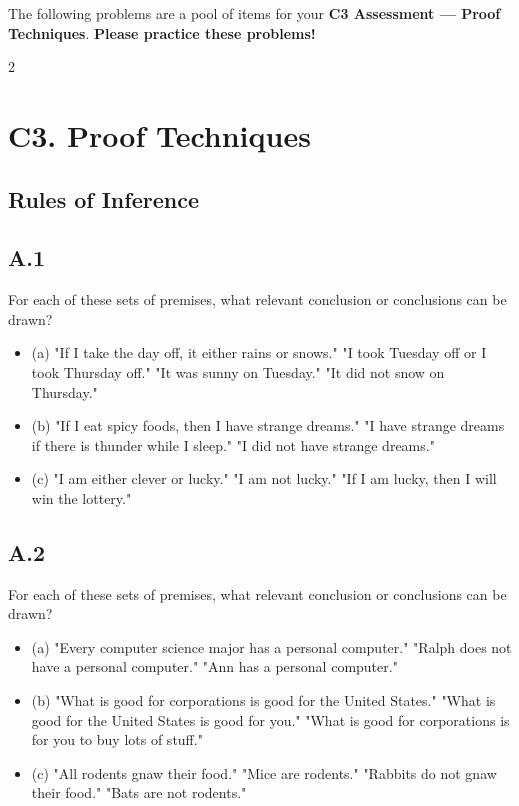 \documentclass[9pt]{article}
\begin{document}
The following problems are a pool of items for your \textbf{C3 Assessment — Proof Techniques}. \textbf{Please practice these problems!}

\begin{multicols}{2}

\section*{C3. Proof Techniques}
\subsection*{Rules of Inference}
\subsection*{A.1}
For each of these sets of premises, what relevant conclusion or conclusions can be drawn?
\begin{itemize}
  \item (a) "If I take the day off, it either rains or snows." "I took Tuesday off or I took Thursday off." "It was sunny on Tuesday." "It did not snow on Thursday."
  \item (b) "If I eat spicy foods, then I have strange dreams." "I have strange dreams if there is thunder while I sleep." "I did not have strange dreams."
  \item (c) "I am either clever or lucky." "I am not lucky." "If I am lucky, then I will win the lottery."
\end{itemize}

\subsection*{A.2}
For each of these sets of premises, what relevant conclusion or conclusions can be drawn?
\begin{itemize}
  \item (a) "Every computer science major has a personal computer." "Ralph does not have a personal computer." "Ann has a personal computer."
  \item (b) "What is good for corporations is good for the United States." "What is good for the United States is good for you." "What is good for corporations is for you to buy lots of stuff."
  \item (c) "All rodents gnaw their food." "Mice are rodents." "Rabbits do not gnaw their food." "Bats are not rodents."
\end{itemize}


\end{multicols}
\end{document}
